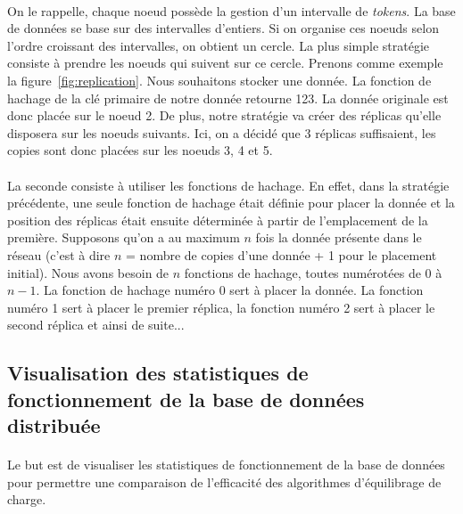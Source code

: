 \documentclass[12pt]{article}
\begin{document}
\paragraph{} On le rappelle, chaque noeud possède la gestion d'un intervalle de \textit{tokens}. La base de données se base sur des intervalles d'entiers. Si on organise ces noeuds selon l'ordre croissant des intervalles, on obtient un cercle. \newline
La plus simple stratégie consiste à prendre les noeuds qui suivent sur ce cercle. Prenons comme exemple la figure~\ref{fig:replication}. Nous souhaitons stocker une donnée. La fonction de hachage de la clé primaire de notre donnée retourne 123. La donnée originale est donc placée sur le noeud 2. \newline
De plus, notre stratégie va créer des réplicas qu'elle disposera sur les noeuds suivants. Ici, on a décidé que 3 réplicas suffisaient, les copies sont donc placées sur les noeuds 3, 4 et 5.

\paragraph{} La seconde consiste à utiliser les fonctions de hachage. En effet, dans la stratégie précédente, une seule fonction de hachage était définie pour placer la donnée et la position des réplicas était ensuite déterminée à partir de l'emplacement de la première. \newline
Supposons qu'on a au maximum $n$ fois la donnée présente dans le réseau (c'est à dire $n$ = nombre de copies d'une donnée + 1 pour le placement initial). Nous avons besoin de $n$ fonctions de hachage, toutes numérotées de $0$ à $n-1$. La fonction de hachage numéro 0 sert à placer la donnée. La fonction numéro 1 sert à placer le premier réplica, la fonction numéro 2 sert à placer le second réplica et ainsi de suite...

\subsection{Visualisation des statistiques de fonctionnement de la base de données distribuée}

\paragraph{} Le but est de visualiser les statistiques de fonctionnement de la base de données pour permettre une comparaison de l'efficacité des algorithmes d'équilibrage de charge.
\end{document}

